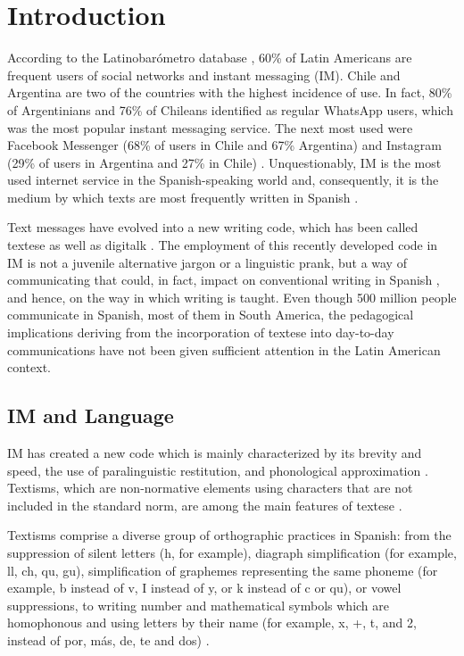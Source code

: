 \documentclass{textolivre}
\begin{document}
\section{Introduction}\label{sec-intro}
According to the Latinobarómetro database \cite{Latinobarometro2018}, 60\% of Latin Americans are frequent users of social networks and instant messaging (IM). Chile and Argentina are two of the countries with the highest incidence of use. In fact, 80\% of Argentinians and 76\% of Chileans identified as regular WhatsApp users, which was the most popular instant messaging service. The next most used were Facebook Messenger (68\% of users in Chile and 67\% Argentina) and Instagram (29\% of users in Argentina and 27\% in Chile) \cite{Chevalier2019}. Unquestionably, IM is the most used internet service in the Spanish-speaking world and, consequently, it is the medium by which texts are most frequently written in Spanish \cite{Martín2016}.

Text messages have evolved into a new writing code, which has been called textese \cite{Johnson2015} as well as digitalk \cite{Turner2010}. The employment of this recently developed code in IM is not a juvenile alternative jargon \cite{Betti2006} or a linguistic prank, but a way of communicating that could, in fact, impact on conventional writing in Spanish \cite{Alonso2008, MasAlvarez2012a}, and hence, on the way in which writing is taught. Even though 500 million people communicate in Spanish, most of them in South America, the pedagogical implications deriving from the incorporation of textese into day-to-day communications have not been given sufficient attention in the Latin American context. 

\subsection{IM and Language}\label{sec-IM}
IM has created a new code which is mainly characterized by its brevity and speed, the use of paralinguistic restitution, and phonological approximation \cite{Thurlow2013, Turner2014}. Textisms, which are non-normative elements using characters that are not included in the standard norm, are among the main features of textese \cite{Johnson2015}.

Textisms comprise a diverse group of orthographic practices in Spanish: from the suppression of silent letters (h, for example), diagraph simplification (for example, ll, ch, qu, gu), simplification of graphemes representing the same phoneme (for example, b instead of v, I instead of y, or k instead of c or qu), or vowel suppressions, to writing number and mathematical symbols which are homophonous and using letters by their name (for example, x, +, t, and 2, instead of por, más, de, te and dos) \cite{Gomez-Camacho2018}.
\end{document}
